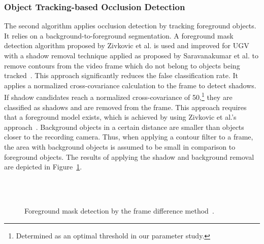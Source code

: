 \subsubsection{Object Tracking-based Occlusion Detection}
The second algorithm applies occlusion detection by tracking foreground objects.
It relies on a background-to-foreground segmentation.
A foreground mask detection algorithm proposed by Zivkovic et al. is used and improved for \ac{UGV} with a shadow removal technique applied as proposed by Saravanakumar et al. to remove contours from the video frame which do not belong to objects being tracked~\cite{Saravanakumar2012,Zivkovic2006}.
This approach significantly reduces the false classification rate.
It applies a normalized cross-covariance calculation to the frame to detect shadows.
If shadow candidates reach a normalized cross-covariance of 50,\footnote{Determined as an optimal threshold in our parameter study.} they are classified as shadows and are removed from the frame.
This approach requires that a foreground model exists, which is achieved by using Zivkovic et al.'s approach~\cite{Zivkovic2006}.
Background objects in a certain distance are smaller than objects closer to the recording camera.
Thus, when applying a contour filter to a frame, the area with background objects is assumed to be small in comparison to foreground objects.
The results of applying the shadow and background removal are depicted in Figure~\ref{fig:554_des:bs}.
\begin{figure}[!htb]
	\centering
	 \quad
	 \\
	 \quad
	 \\        
	
	\caption[Images show a foreground mask comparison of video frames.]{Foreground mask detection by the frame difference method~\cite{Saravanakumar2012}.} \label{fig:554_des:bs}
\end{figure} 

